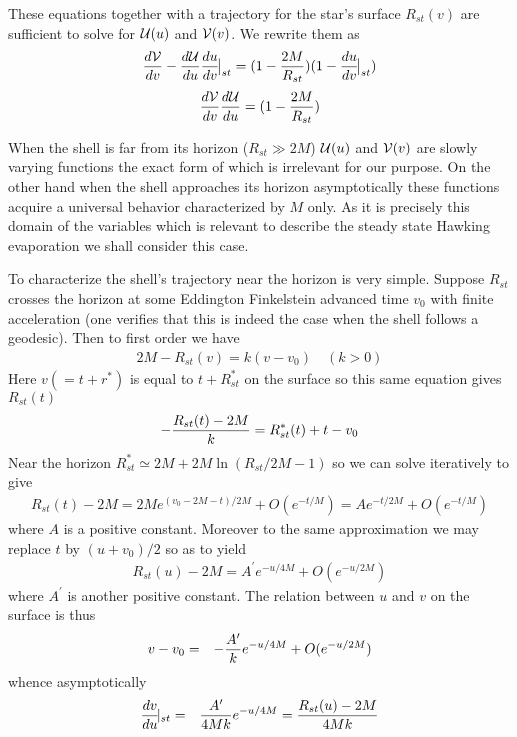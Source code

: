 \documentclass[12pt,oneside]{report}
\begin{document}
These equations together with a trajectory for the star's surface
$R_{st}(v)$ are sufficient to solve for 
$ {\cal{U}} (u)$ and $ {\cal{V}} (v)$. We
rewrite them as
\begin{equation}
{ d {\cal{V}}  \over dv} - {d {\cal{U}}  \over du} {du \over dv}\!\bigr\vert_{st}
= (1 - {2M \over R_{st}})(1 - {du \over dv}\!\bigl\vert_{st})
\label{E.2B}\end{equation}
\begin{equation}
{ d {\cal{V}}  \over dv}  {d {\cal{U}}  \over du}
= (1 - {2M \over R_{st}})\label{E.3B}\end{equation}

When the shell is far from its horizon ($R_{st}\gg 2M$)
$ {\cal{U}} (u)$ and $ {\cal{V}} (v)$ are slowly varying functions 
the exact form of
which is irrelevant for our purpose. On the other hand when the shell 
approaches its horizon asymptotically these functions acquire
a universal behavior characterized by $M$ only. 
As it is precisely this domain of the variables which is
relevant to describe the steady state Hawking evaporation we shall
consider this case. 

To characterize the shell's trajectory near the horizon is very
simple. Suppose $R_{st}$ crosses the horizon at some  
Eddington Finkelstein advanced
time $v_0$ with finite acceleration (one verifies that this is indeed the case 
when the shell follows a geodesic). 
Then to first order we have
\begin{eqnarray}
2M - R_{st}(v) = k (v - v_0) \quad (k>0)\label{E.4}
\end{eqnarray}
Here $v(=t + r^*)$ is equal to $t+R^*_{st}$ on the surface so this
same equation gives $R_{st}(t)$
\begin{eqnarray}
-{R_{st}(t)-2M \over k}=  R^*_{st}(t) + t - v_0 \label{E.5}
\end{eqnarray} 
Near the horizon $R^*_{st} \simeq 2M + 2M \ln (R_{st}/2M - 1) $ so
we can solve iteratively to give
\begin{eqnarray}
R_{st}(t)-2M =  2M e^{(v_0 -2M -t)/2M} + O(e^{-t/M})= A e^{-t/2M} +
O(e^{-t/M}) \label{E.6} \end{eqnarray}
where $A$ is a positive constant.
Moreover to the same approximation we may replace $t$ by
$(u+v_0)/2$ so as to yield 
\begin{eqnarray}
R_{st}(u)-2M =  A^\prime e^{ -u/4M}  + O(e^{-u/2M})
\label{E.7} \end{eqnarray}
where $A^\prime$ is another positive constant. The relation between $u$ and
$v$ on the surface is thus
\begin{eqnarray}
v- v_0 &=& -{A^\prime\over k} e^{ -u/4M} + O(e^{-u/2M})
\label{E.8b}\end{eqnarray}
whence asymptotically
\begin{eqnarray}
{dv \over du}\!\vert_{st} &=& {A^\prime\over 4 M  k} e^{ -u/4M}
=  {R_{st}(u) - 2M \over 4M k}
\label{E.8}\end{eqnarray}  
\end{document}
